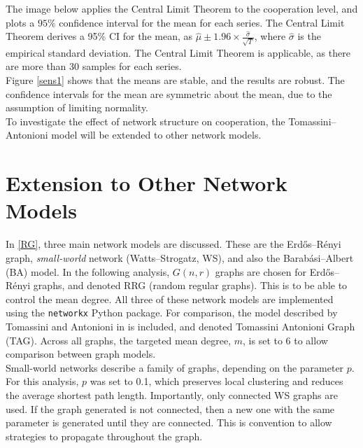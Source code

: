 The image below applies the Central Limit Theorem to the cooperation level, and plots a $95\%$ confidence interval for the mean for each series. The Central Limit Theorem derives a 95\% CI for the mean, as $\hat{\mu} \pm 1.96\times\frac{\hat{\sigma}}{\sqrt{T}}$, where $\hat{\sigma}$ is the empirical standard deviation. The Central Limit Theorem is applicable, as there are more than 30 samples for each series. \\
\FloatBarrier
{}
\FloatBarrier
Figure \ref{sens1} shows that the means are stable, and the results are robust. The confidence intervals for the mean are symmetric about the mean, due to the assumption of limiting normality. \\

To investigate the effect of network structure on cooperation, the Tomassini--Antonioni model will be extended to other network models. \\

\section{Extension to Other Network Models} \label{other_networks}

In \ref{RG}, three main network models are discussed. These are the Erd\H{o}s--R\'enyi graph, \emph{small-world} network (Watts--Strogatz, WS), and also the Barab\'{a}si--Albert (BA) model. In the following analysis, $G(n,r)$ graphs are chosen for Erd\H{o}s--R\'enyi graphs, and denoted RRG (random regular graphs). This is to be able to control the mean degree. All three of these network models are implemented using the \verb+networkx+ Python package. For comparison, the model described by Tomassini and Antonioni in \cite{RN51} is included, and denoted Tomassini Antonioni Graph (TAG). Across all graphs, the targeted mean degree, $m$, is set to 6 to allow comparison between graph models. \\

Small-world networks describe a family of graphs, depending on the parameter $p$. For this analysis, $p$ was set to 0.1, which preserves local clustering and reduces the average shortest path length. Importantly, only connected WS graphs are used. If the graph generated is not connected, then a new one with the same parameter is generated until they are connected. This is convention to allow strategies to propagate throughout the graph. \\

